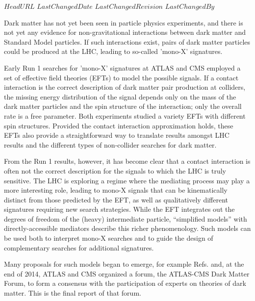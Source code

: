 \svnidlong
{$HeadURL$}
{$LastChangedDate$}
{$LastChangedRevision$}
{$LastChangedBy$}
\pagestyle{fancy}
\fancyhead{}
\fancyhead[ol]{\svnrev;\svndate;\svnauthor}

Dark matter has not yet been seen in particle physics experiments, and
there is not yet any evidence for non-gravitational interactions between dark
matter and Standard Model particles.  If such interactions exist,
pairs of dark matter particles could be produced at the LHC, leading
to so-called 'mono-X' signatures.

Early Run 1 searches for 'mono-X' signatures at ATLAS and CMS employed
a set of effective field theories (EFTs) \cite{Goodman:2010ku} to
model the possible signals. If a contact interaction is the correct
description of dark matter pair production at colliders, the missing
energy distribution of the signal depends only on the mass of the dark
matter particles and the spin structure of the interaction; only the
overall rate is a free parameter. Both experiments studied a variety
EFTs with different spin structures. Provided the contact interaction
approximation holds, these EFTs also provide a straightforward way to
translate results amongst LHC results and the different types of
non-collider searches for dark matter.

From the Run 1 results, however, it has become clear
\cite{Busoni:2013lha} that a contact interaction is often not the
correct description for the signals to which the LHC is truly
sensitive. The LHC is exploring a regime where the mediating process
may play a more interesting role, leading to mono-X signals that can
be kinematically distinct from those predicted by the EFT, as well as
qualitatively different signatures requiring new search
strategies. While the EFT integrates out the degrees of freedom of the
(heavy) intermediate particle, ``simplified models''
\cite{Alves:2011wf} with directly-accessible mediators describe this
richer phenomenology. Such models can be used both to interpret mono-X
searches and to guide the design of complementary searches for
additional signatures. 

Many proposals for such models began to emerge, for example
Refs. \cite{An:2012va,An:2012ue,Tait:2013,Buchmueller:2013dya,Bai:2013iqa,Bai:2014osa,An:201489115014,Yavin:14092893,Malik:2014ggr,Harris:2014hga,Buckley:2014fba}
and, at the end of 2014, ATLAS and CMS organized a forum, the
ATLAS-CMS Dark Matter Forum, to form a consensus with the
participation of experts on theories of dark matter. This is the final
report of that forum.

